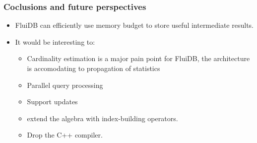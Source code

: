 \begin{frame}
  \frametitle{Coclusions and future perspectives}

  \begin{itemize}
  \item FluiDB can efficiently use memory budget to store useful
    intermediate results.
  \item It would be interesting to:
    \begin{itemize}
    \item Cardinality estimation is a major pain point for FluiDB, the
      architecture is accomodating to propagation of statistics
    \item Parallel query processing
    \item Support updates
    \item extend the algebra with index-building operators.
    \item Drop the C++ compiler.
    \end{itemize}
  \end{itemize}
\end{frame}
